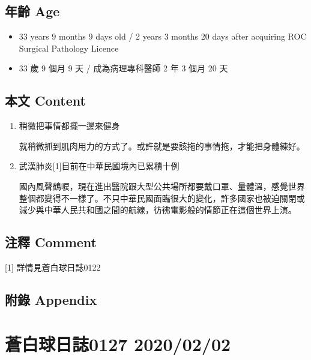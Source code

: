 \documentclass[a5paper, 12pt
]{book}
\providecommand{\tightlist}{%
  \setlength{\itemsep}{0pt}\setlength{\parskip}{0pt}}
\begin{document}
\hypertarget{ux5e74ux9f61-age-62}{%
\subsection{年齡 Age}\label{ux5e74ux9f61-age-62}}

\begin{itemize}
\tightlist
\item
  33 years 9 months 9 days old / 2 years 3 months 20 days after
  acquiring ROC Surgical Pathology Licence
\item
  33 歲 9 個月 9 天 / 成為病理專科醫師 2 年 3 個月 20 天
\end{itemize}

\hypertarget{ux672cux6587-content-62}{%
\subsection{本文 Content}\label{ux672cux6587-content-62}}

\begin{enumerate}
\def\labelenumi{\arabic{enumi}.}
\item
  稍微把事情都擺一邊來健身

  就稍微抓到肌肉用力的方式了。或許就是要該拖的事情拖，才能把身體練好。
\item
  武漢肺炎{[}1{]}目前在中華民國境內已累積十例

  國內風聲鶴唳，現在進出醫院跟大型公共場所都要戴口罩、量體溫，感覺世界整個都變得不一樣了。不只中華民國面臨很大的變化，許多國家也被迫關閉或減少與中華人民共和國之間的航線，彷彿電影般的情節正在這個世界上演。
\end{enumerate}

\hypertarget{ux6ce8ux91cb-comment-61}{%
\subsection{注釋 Comment}\label{ux6ce8ux91cb-comment-61}}

{[}1{]} 詳情見蒼白球日誌0122

\hypertarget{ux9644ux9304-appendix-62}{%
\subsection{附錄 Appendix}\label{ux9644ux9304-appendix-62}}

\hypertarget{ux84bcux767dux7403ux65e5ux8a8c0127-20200202}{%
\section{蒼白球日誌0127
2020/02/02}\label{ux84bcux767dux7403ux65e5ux8a8c0127-20200202}}
\end{document}
